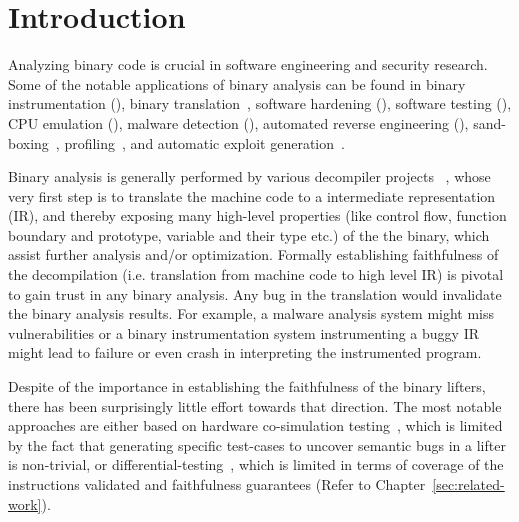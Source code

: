 \chapter{Introduction}\label{sec:ba}

Analyzing binary code is crucial in software engineering and security research.
Some of the notable applications of binary analysis can be found in binary
instrumentation (\cite{Bruening:CGO2003,PEBIL10,Pin:2005,Valgrind:ENTCS03,DynamoRIO:2004}),
                binary translation~\cite{UQBT:2000}, software hardening
                (\cite{Cha:2015,Ford:2008,Zhang,Zhang:2013}), software testing
                (\cite{Chipounov:2011,Avgerinos:2014,godefroid_automated_2008}),
                CPU emulation (\cite{QEMU:USENIX05,Magnusson:2002}), malware
                detection (\cite{Christodorescu:2005,Kruegel:2004,BitBlaze:2008,BAP:CAV11,Egele:USENIX07,Yin:CCS07}), automated
                reverse engineering
                (\cite{Cui:2008,Lin:2008,Schwartz:2013,Yakdan2015NDSS,McSema:Recon14,Angr,Radare2}), sand-boxing~\cite{Kiriansky:2002:SEV,Erlingsson:2006,Yee:2009},
                profiling~\cite{Harris:2005,Srivastava:1994}, and
                automatic exploit generation~\cite{Cha:2012}.
               
                 Binary analysis
                is generally performed by various decompiler projects
                ~\cite{McSema:Recon14,Remill,Angr1,BAP:CAV11,Radare2}, whose
                very first step is to translate the machine code to a
                intermediate representation (IR), and thereby exposing many
                high-level properties (like control flow, function boundary and
                    prototype, variable and their type etc.) of the the binary,
                which  assist further analysis and/or optimization. Formally
                establishing faithfulness of the decompilation (i.e.
                    translation from machine code to high level IR) is pivotal
                to gain trust in any binary analysis. Any bug in the
                translation would
invalidate the binary analysis results. 
For example, a
malware analysis system might miss vulnerabilities or a binary instrumentation
system instrumenting a buggy IR might lead to failure or even crash in
interpreting the instrumented program.

Despite of the importance in
establishing the faithfulness of the binary lifters, there has been
surprisingly little effort towards that direction. 
The most notable approaches
are either based on hardware co-simulation
testing~\cite{Martignoni:ISSTA2009,Martignoni:ISSTA2010}, which is limited by
the fact that generating specific test-cases to uncover semantic bugs in a
lifter is non-trivial, or differential-testing~\cite{Martignoni:ASPLOS2012,ASE2017}, which is limited in terms of coverage of the instructions validated
 and faithfulness guarantees (Refer to
    Chapter~\ref{sec:related-work}).

